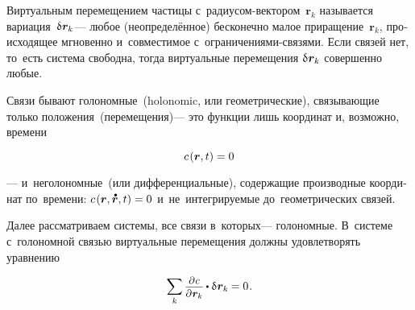 

\label{para:virtualworkprinciple.genericmechanics}

\begin{otherlanguage}{russian}

Виртуальным перемещением частицы с~радиусом\hbox{-}вектором~${\bm{r}_k}$ называется вариация~${\variation{\hspace{.1ex}\bm{r}_k}}$\:--- %
любое (неопределённое) бесконечно малое приращение~${\bm{r}_k}$, происходящее мгновенно %
и~совместимое с~ограничениями\hbox{-}связями. %
Если связей нет, то~есть система свободна, тогда виртуальные перемещения ${\variation{\hspace{.1ex}\bm{r}_k}}$ совершенно любые.

Связи бывают голономные~(holonomic, или геометрические), связывающие только положения~(перемещения)\:--- это функции лишь координат и, возможно, времени

\nopagebreak\vspace{-0.1em}\begin{equation}\label{holonomicconstraint}
c\hspace{.2ex}(\bm{r}, t) = 0
\end{equation}

\vspace{-0.12em} \noindent --- и~неголономные~(или дифференциальные), содержащие производные координат по~времени: ${c\hspace{.2ex}(\bm{r}, \mathdotabove{\bm{r}}, t) = 0}$ и~не~интегрируемые до~геометрических связей.

Далее рассматриваем системы, все связи в~которых\:--- голономные. В~системе с~голономной связью виртуальные перемещения должны удовлетворять уравнению

\nopagebreak\vspace{-0.1em}\begin{equation}\label{requirementforvirtualdisplacements}
\displaystyle \sum_k \scalebox{0.92}{$\displaystyle \frac{\raisemath{-0.12em}{\partial \hspace{.1ex} c}}{\partial \hspace{.1ex} \bm{r}_k}$} \hspace{-0.1ex} \dotp \variation{\hspace{.1ex}\bm{r}_k} \hspace{-0.1ex} = 0 \hspace{.16ex}.
\vspace{-0.25em}\end{equation}


\end{otherlanguage}

